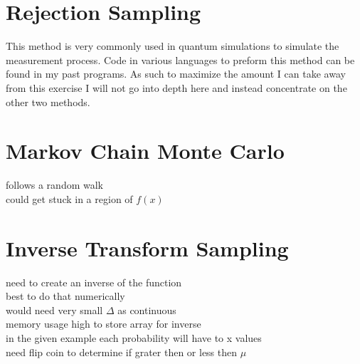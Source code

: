 \documentclass{article}
\begin{document}
\section{Rejection Sampling}

This method is very commonly used in quantum simulations to simulate the measurement process. Code in various languages to preform this method can be found in my past programs.  As such to maximize the amount I can take away from this exercise I will not go into depth here and instead concentrate on the other two methods.

\section{Markov Chain Monte Carlo}

follows a random walk \\
could get stuck in a region of $f(x)$


\section{Inverse Transform Sampling}

need to create an inverse of the function \\
best to do that numerically \\
would need very small $\Delta$ as continuous\\
memory usage high to store array for inverse\\
in the given example each probability will have to x values\\
need flip coin to determine if grater then or less then $\mu$
\end{document}

